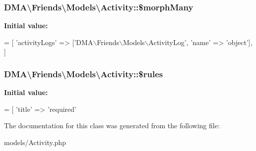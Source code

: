\hypertarget{classDMA_1_1Friends_1_1Models_1_1Activity_a192fdaacf609961b7a436d2b967dfd60}{
\subsubsection[{\$morph\-Many}]{\setlength{\rightskip}{0pt plus 5cm}D\-M\-A\textbackslash{}\-Friends\textbackslash{}\-Models\textbackslash{}\-Activity\-::\$morph\-Many}}\label{classDMA_1_1Friends_1_1Models_1_1Activity_a192fdaacf609961b7a436d2b967dfd60}
{\bfseries Initial value\-:}
\begin{DoxyCode}
= [ 
        \textcolor{stringliteral}{'activityLogs'}  => [\textcolor{stringliteral}{'DMA\(\backslash\)Friends\(\backslash\)Models\(\backslash\)ActivityLog'}, \textcolor{stringliteral}{'name'} => \textcolor{stringliteral}{'object'}],
    ]
\end{DoxyCode}
\hypertarget{classDMA_1_1Friends_1_1Models_1_1Activity_a0b92e75aa8d92e2d3c9b24f54cd813bc}{
\subsubsection[{\$rules}]{\setlength{\rightskip}{0pt plus 5cm}D\-M\-A\textbackslash{}\-Friends\textbackslash{}\-Models\textbackslash{}\-Activity\-::\$rules}}\label{classDMA_1_1Friends_1_1Models_1_1Activity_a0b92e75aa8d92e2d3c9b24f54cd813bc}
{\bfseries Initial value\-:}
\begin{DoxyCode}
= [ 
        \textcolor{stringliteral}{'title'} => \textcolor{stringliteral}{'required'}
\end{DoxyCode}


The documentation for this class was generated from the following file\-:\begin{DoxyCompactItemize}
\item 
models/Activity.\-php\end{DoxyCompactItemize}
